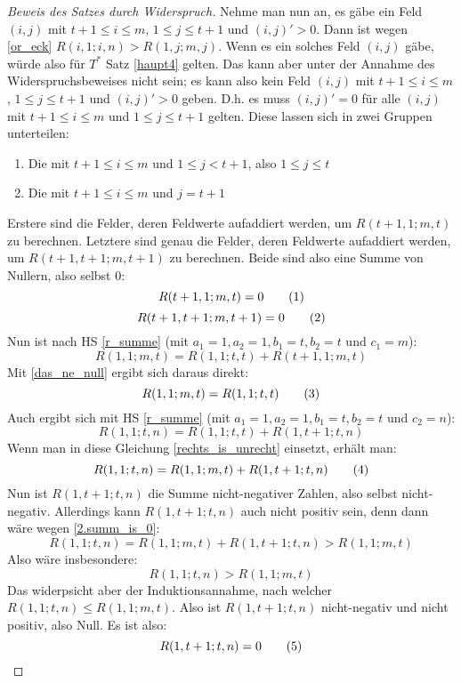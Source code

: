 \begin{proof}[Beweis des Satzes durch Widerspruch]
    Nehme man nun an, es gäbe ein Feld $(i, j)$ mit $t+1\leq i\leq m$, $1\leq j\leq t+1$ und $(i, j)'>0$. Dann 
    ist wegen \eqref{or_eck} $R(i, 1; i, n)>R(1, j; m, j)$. Wenn es ein solches Feld $(i, j)$ gäbe, würde also für 
    $T^*$ Satz \ref{haupt4} gelten. Das kann aber unter der Annahme des Widerspruchsbeweises nicht sein; es kann 
    also kein Feld $(i, j)$ mit $t+1\leq i\leq m$, $1\leq j\leq t+1$ und $(i, j)'>0$ geben. D.h. es muss $(i, j)'
    =0$ für alle $(i, j)$ mit $t+1\leq i\leq m$ und $1\leq j\leq t+1$ gelten. Diese lassen sich in zwei Gruppen 
    unterteilen:
    \begin{enumerate}
        \item Die mit $t+1\leq i\leq m$ und $1\leq j<t+1$, also $1\leq j\leq t$
        \item Die mit $t+1\leq i\leq m$ und $j=t+1$
    \end{enumerate}
    Erstere sind die Felder, deren Feldwerte aufaddiert werden, um $R(t+1, 1; m, t)$ zu berechnen. 
    Letztere sind genau die Felder, deren Feldwerte aufaddiert werden, um $R(t+1, t+1; m, t+1)$ zu berechnen. 
    Beide sind also eine Summe von Nullern, also selbst 0:
    \[
        R(t+1, 1; m, t)=0 \numberthis \label{das_ne_null}
    \]
    \[
        R(t+1, t+1; m, t+1)=0 \numberthis \label{nuller_spalte}
    \]
    Nun ist nach HS \ref{r_summe} (mit $a_1=1, a_2=1, b_1=t, b_2=t$ und $c_1=m$):
    \[
        R(1, 1; m, t)=R(1, 1; t, t)+R(t+1, 1; m, t)
    \]
    Mit \eqref{das_ne_null} ergibt sich daraus direkt:
    \[
        R(1, 1; m, t)=R(1, 1; t, t)\numberthis \label{rechts_is_unrecht}
    \]
    Auch ergibt sich mit HS \ref{r_summe} (mit $a_1=1, a_2=1, b_1=t, b_2=t$ und $c_2=n$):
    \[
        R(1, 1; t, n)=R(1, 1; t, t)+R(1, t+1; t, n)
    \]
    Wenn man in diese Gleichung \eqref{rechts_is_unrecht} einsetzt, erhält man:
    \[
        R(1, 1; t, n)=R(1, 1; m, t)+R(1, t+1; t, n) \numberthis \label{2.summ_is_0}
    \]
    Nun ist $R(1, t+1; t, n)$ die Summe nicht-negativer Zahlen, also selbst nicht-negativ. Allerdings kann $R(1, t+1; 
    t, n)$ auch nicht positiv sein, denn dann wäre wegen \eqref{2.summ_is_0}:
    \[
        R(1, 1; t, n)=R(1, 1; m, t)+R(1, t+1; t, n)>R(1, 1; m, t)
    \]
    Also wäre insbesondere:
    \[
        R(1, 1; t, n)>R(1, 1; m, t)
    \]
    Das widerpsicht aber der Induktionsannahme, nach welcher $R(1, 1; t, n)\leq R(1, 1; m, t)$. Also ist $R(1, t+1; 
    t, n)$ nicht-negativ und nicht positiv, also Null. Es ist also:
    \[
        R(1, t+1; t, n)=0 \numberthis \label{rest_auch_0}
    \]

\end{proof}
